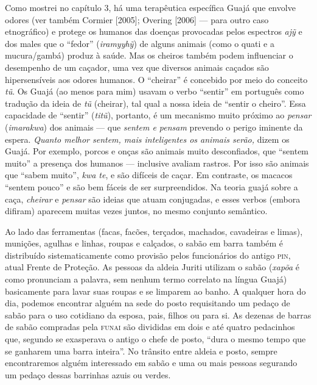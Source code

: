 Como mostrei no capítulo 3, há uma terapêutica específica Guajá que
envolve odores (ver também Cormier {[}2005{]}; Overing {[}2006{]} --- para
outro caso etnográfico) e protege os humanos das doenças provocadas
pelos espectros \emph{ajỹ} e dos males que o ``fedor'' (\emph{iramyyhỹ})
de alguns animais (como o quati e a mucura/gambá) produz à saúde. Mas os
cheiros também podem influenciar o desempenho de um caçador, uma vez que
diversos animais caçados são hipersensíveis aos odores humanos. O
``cheirar'' é concebido por meio do conceito \emph{tũ}. Os Guajá (ao
menos para mim) usavam o verbo ``sentir'' em português como tradução da
ideia de \emph{tũ} (cheirar), tal qual a nossa ideia de ``sentir o
cheiro''. Essa capacidade de ``sentir'' (\emph{titũ}), portanto, é um
mecanismo muito próximo ao \emph{pensar} (\emph{imarakwa}) dos animais ---
que \emph{sentem e pensam} prevendo o perigo iminente da espera.
\emph{Quanto melhor sentem, mais inteligentes os animais serão,} dizem
os Guajá. Por exemplo, porcos e onças são animais muito desconfiados,
que ``sentem muito'' a presença dos humanos --- inclusive avaliam rastros.
Por isso são animais que ``sabem muito'', \emph{kwa te}, e são difíceis de
caçar. Em contraste, os macacos ``sentem pouco'' e são bem fáceis de ser
surpreendidos. Na teoria guajá sobre a caça, \emph{cheirar} e
\emph{pensar} são ideias que atuam conjugadas, e esses verbos (embora
difiram) aparecem muitas vezes juntos, no mesmo conjunto semântico.

Ao lado das ferramentas (facas, facões, terçados, machados, cavadeiras e
limas), munições, agulhas e linhas, roupas e calçados, o sabão em barra
também é distribuído sistematicamente como provisão pelos funcionários
do antigo \textsc{pin}, atual Frente de Proteção. As pessoas da aldeia Juriti
utilizam o sabão (\emph{xapõa} é como pronunciam a palavra, sem nenhum
termo correlato na língua Guajá) basicamente para lavar suas roupas e se
limparem ao banho. A qualquer hora do dia, podemos encontrar alguém na
sede do posto requisitando um pedaço de sabão para o uso cotidiano da
esposa, pais, filhos ou para si. As dezenas de barras de sabão compradas
pela \textsc{funai} são divididas em dois e até quatro pedacinhos que, segundo se
exasperava o antigo o chefe de posto, ``dura o mesmo tempo que se
ganharem uma barra inteira''. No trânsito entre aldeia e posto, sempre
encontraremos alguém interessado em sabão e uma ou mais pessoas
segurando um pedaço dessas barrinhas azuis ou verdes.

